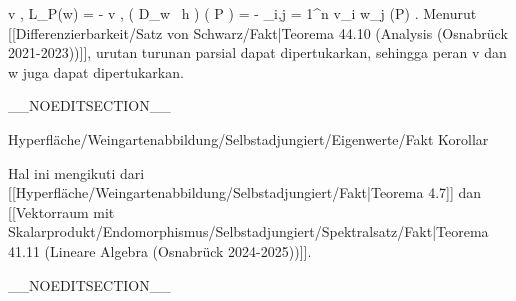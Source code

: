 {\mavergleichskettealign
{\vergleichskettealign
{ \left\langle  v  ,  L_P(w)  \right\rangle
}
{ =} { - {  } \left\langle  v  ,  \left(  D_{w}
 \,  h   \right) \left(   P   \right)   \right\rangle
}
{ =} { -  {  }  \sum_{i,j = 1}^n v_i  w_j  {  } {  }  (P)
}
{ } {
}
{ } {
}
}
{}
{}{.}
Menurut
[[Differenzierbarkeit/Satz von Schwarz/Fakt|Teorema 44.10 (Analysis (Osnabrück 2021-2023))]],
urutan turunan parsial dapat dipertukarkan, sehingga peran
\mathkor {} {v} {dan} {w} {}
juga dapat dipertukarkan.

}

__NOEDITSECTION__

{Hyperfläche/Weingartenabbildung/Selbstadjungiert/Eigenwerte/Fakt}
{Korollar}
{}
{

\faktzusatz {}
\faktzusatz {}

}
{

Hal ini mengikuti dari
[[Hyperfläche/Weingartenabbildung/Selbstadjungiert/Fakt|Teorema 4.7]]
dan
[[Vektorraum mit Skalarprodukt/Endomorphismus/Selbstadjungiert/Spektralsatz/Fakt|Teorema 41.11 (Lineare Algebra (Osnabrück 2024-2025))]].

}

__NOEDITSECTION__

